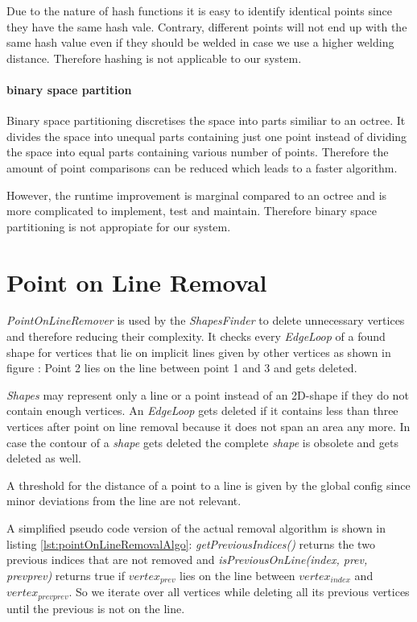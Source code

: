 \documentclass[../ClassicThesis.tex]{subfiles}
\begin{document}
Due to the nature of hash functions it is easy to identify identical points since they have the same hash vale. Contrary, different points will not end up with the same hash value even if they should be welded in case we use a higher welding distance. Therefore hashing is not applicable to our system.

\paragraph{binary space partition}

Binary space partitioning discretises the space into parts similiar to an octree. It divides the space into unequal parts containing just one point instead of dividing the space into equal parts containing various number of points. Therefore the amount of point comparisons can be reduced which leads to a faster algorithm.

However, the runtime improvement is marginal compared to an octree and is more complicated to implement, test and maintain. Therefore binary space partitioning is not appropiate for our system.





\section{Point on Line Removal}

\emph{PointOnLineRemover} is used by the \emph{ShapesFinder} to delete unnecessary vertices and therefore reducing their complexity. It checks every \emph{EdgeLoop} of a found shape for vertices that lie on implicit lines given by other vertices as shown in figure : Point 2 lies on the line between point 1 and 3 and gets deleted.


\emph{Shapes} may represent only a line or a point instead of an 2D-shape if they do not contain enough vertices. An \emph{EdgeLoop} gets deleted if it contains less than three vertices after point on line removal because it does not span an area any more. In case the contour of a \emph{shape} gets deleted the complete \emph{shape} is obsolete and gets deleted as well.

A threshold for the distance of a point to a line is given by the global config since minor deviations from the line are not relevant.

A simplified pseudo code version of the actual removal algorithm is shown in listing \ref{lst:pointOnLineRemovalAlgo}: \emph{getPreviousIndices()} returns the two previous indices that are not removed and \emph{isPreviousOnLine(index, prev, prevprev)} returns true if $ vertex_{prev}$ lies on the line between $vertex_{index}$ and $vertex_{prevprev}$. So we iterate over all vertices while deleting all its previous vertices until the previous is not on the line. 
\end{document}
